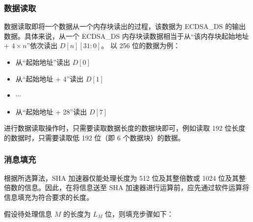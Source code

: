 \documentclass[main\_\_CN.tex]{subfiles}
\begin{document}
\subsubsection{数据读取}

数据读取即将一个数据从一个内存块读出的过程，该数据为 ECDSA\_DS 的输出数据。具体来说，从一个 ECDSA\_DS 内存块读数据相当于从“该内存块起始地址 + $4 \times n$”依次读出 $D[n][31:0]$。
以 256 位的数据为例：
\begin{itemize}
    \item 从“起始地址”读出 $D[0]$
    \item 从“起始地址 + 4”读出 $D[1]$
    \item $\cdots$
    \item 从“起始地址 + 28”读出 $D[7]$
\end{itemize}

\begin{tiplisting}
进行数据读取操作时，只需要读取数据长度的数据块即可，例如读取 192 位长度的数据时，只需要读取低 192 位（即 6 个数据块）的数据。
\end{tiplisting}

\subsubsection{消息填充}\label{sec:ecdsa-msg-padding}

根据所选算法，SHA 加速器仅能处理长度为 512 位及其整倍数或 1024 位及其整倍数的信息。因此，在将信息送至 SHA 加速器进行运算前，应先通过软件运算将信息填充为符合要求的长度。

假设待处理信息 \begin{math} M \end{math} 的长度为 \begin{math}L_M\end{math} 位，则填充步骤如下：
\end{document}
